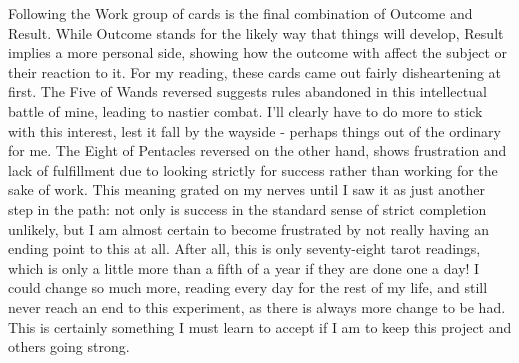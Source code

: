 Following the Work group of cards is the final combination of Outcome
and Result.  While Outcome stands for the likely way that things will
develop, Result implies a more personal side, showing how the outcome
with affect the subject or their reaction to it.  For my reading, these
cards came out fairly disheartening at first.  The Five of Wands
reversed suggests rules abandoned in this intellectual battle of mine, leading to
nastier combat.  I'll clearly have to do more to stick with this
interest, lest it fall by the wayside - perhaps things out of the
ordinary for me.  The Eight of Pentacles reversed on the other hand,
shows frustration and lack of fulfillment due to looking strictly for
success rather than working for the sake of work.  This meaning grated
on my nerves until I saw it as just another step in the path: not only
is success in the standard sense of strict completion unlikely, but I 
am almost certain to become frustrated by not really having an ending
point to this at all.  After all, this is only seventy-eight tarot
readings, which is only a little more than a fifth of a year if they are
done one a day!  I could change so much more, reading every day for the
rest of my life, and still never reach an end to this experiment, as
there is always more change to be had.  This is certainly something I
must learn to accept if I am to keep this project and others going
strong.
